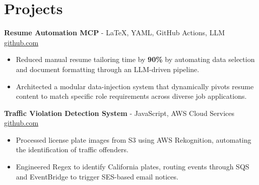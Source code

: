 \documentclass[11pt]{article}
\begin{document}
\vspace{-18.5pt}

\section*{Projects}

\textbf{Resume Automation MCP}{ - LaTeX, YAML, GitHub Actions, LLM} \hfill \href{https://github.com/Monica20030707/Tex_OrangeLeaf-mcp}{github.com}
\vspace{-9pt}
\begin{itemize}
  \item Reduced manual resume tailoring time by \textbf{90\%} by automating data selection and document formatting through an LLM-driven pipeline.
  \item Architected a modular data-injection system that dynamically pivots resume content to match specific role requirements across diverse job applications.
\end{itemize}

\textbf{Traffic Violation Detection System}{ - JavaScript, AWS Cloud Services} \hfill \href{https://github.com/Monica20030707/AWS_rekonigition-N-read-database}{github.com}
\vspace{-9pt}
\begin{itemize}
  \item Processed license plate images from S3 using AWS Rekognition, automating the identification of traffic offenders.
  \item Engineered Regex to identify California plates, routing events through SQS and EventBridge to trigger SES-based email notices.
\end{itemize}

\end{document}
